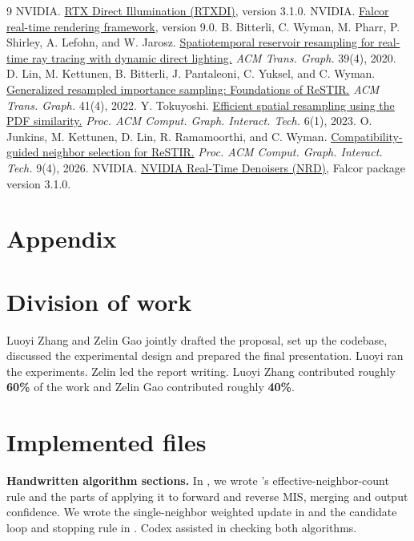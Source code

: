 \documentclass[a4paper,twocolumn]{article}
\begin{document}
\begin{thebibliography}{9}
 NVIDIA. \href{https://github.com/NVIDIA-RTX/RTXDI/releases/tag/v3.1.0}{RTX Direct Illumination (RTXDI)}, version 3.1.0.
 NVIDIA. \href{https://github.com/NVIDIAGameWorks/Falcor/releases/tag/9.0}{Falcor real-time rendering framework}, version 9.0.
 B. Bitterli, C. Wyman, M. Pharr, P. Shirley, A. Lefohn, and W. Jarosz. \href{https://doi.org/10.1145/3386569.3392481}{Spatiotemporal reservoir resampling for real-time ray tracing with dynamic direct lighting.} \emph{ACM Trans. Graph.} 39(4), 2020.
 D. Lin, M. Kettunen, B. Bitterli, J. Pantaleoni, C. Yuksel, and C. Wyman. \href{https://doi.org/10.1145/3528223.3530158}{Generalized resampled importance sampling: Foundations of ReSTIR.} \emph{ACM Trans. Graph.} 41(4), 2022.
 Y. Tokuyoshi. \href{https://doi.org/10.1145/3585501}{Efficient spatial resampling using the PDF similarity.} \emph{Proc. ACM Comput. Graph. Interact. Tech.} 6(1), 2023.
 O. Junkins, M. Kettunen, D. Lin, R. Ramamoorthi, and C. Wyman. \href{https://doi.org/10.1145/3820024}{Compatibility-guided neighbor selection for ReSTIR.} \emph{Proc. ACM Comput. Graph. Interact. Tech.} 9(4), 2026.
 NVIDIA. \href{https://github.com/NVIDIA-RTX/NRD}{NVIDIA Real-Time Denoisers (NRD)}, Falcor package version 3.1.0.
\end{thebibliography}


\clearpage
\section*{Appendix}
\appendix
\section{Division of work}
Luoyi Zhang and Zelin Gao jointly drafted the proposal, set up the codebase, discussed the experimental design and prepared the final presentation. Luoyi ran the experiments. Zelin led the report writing. Luoyi Zhang contributed roughly \textbf{60\%} of the work and Zelin Gao contributed roughly \textbf{40\%}.

\section{Implemented files}
\textbf{Handwritten algorithm sections.} In , we wrote 's effective-neighbor-count rule and the parts of  applying it to forward and reverse MIS, merging and output confidence. We wrote the single-neighbor weighted update in  and the candidate loop and stopping rule in . Codex assisted in checking both algorithms.
\end{document}
